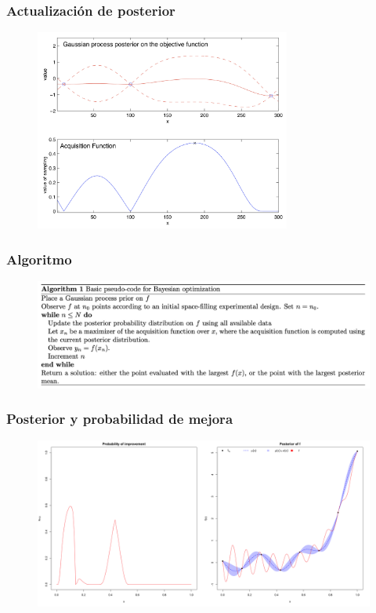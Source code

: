 \documentclass[fleqn]{beamer}
\begin{document}
\begin{frame}
  \frametitle{Actualización de posterior}
  \begin{figure}[h]
    \centering
    \includegraphics[width=0.75\textwidth]{Figures/acq.png}
    \label{fig:acq}
  \end{figure}
\end{frame}

\begin{frame}
  \frametitle{Algoritmo}
  \begin{figure}[h]
    \centering
    \includegraphics[width=1\textwidth]{Figures/algoritmo.png}
    \label{fig:algo}
  \end{figure}
\end{frame}

\begin{frame}
  \frametitle{Posterior y probabilidad de mejora}
  \begin{figure}[h]
    \centering
    \includegraphics[width=1\textwidth]{Figures/ProbImprove.png}
    \label{fig:probimprove}
  \end{figure}
\end{frame}
\end{document}
